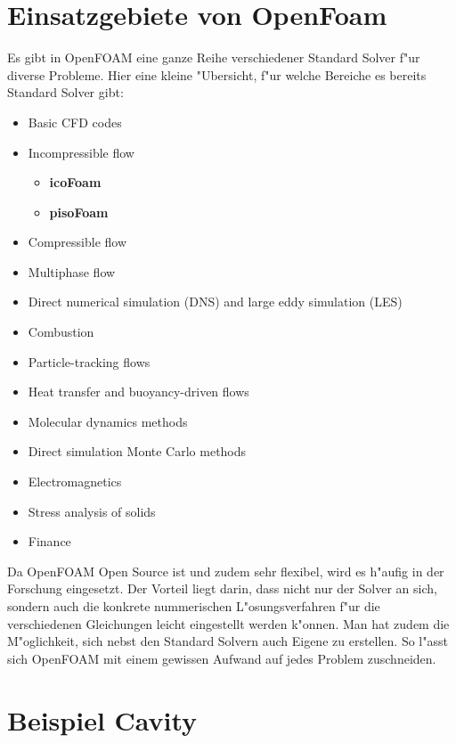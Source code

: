 \begin{refsection}
\section{Einsatzgebiete von OpenFoam}
Es gibt in OpenFOAM eine ganze Reihe verschiedener Standard Solver f"ur diverse Probleme. Hier eine kleine "Ubersicht, f"ur welche Bereiche es bereits Standard Solver gibt:
\begin{itemize}
\setlength{\itemsep}{2pt}
\setlength{\parsep}{2pt}
\item Basic CFD codes  
\item Incompressible flow 
\begin{itemize}
\item \textbf{icoFoam}
\item \textbf{pisoFoam}
\end{itemize}
\item Compressible flow 
\item Multiphase flow
\item Direct numerical simulation (DNS) and large eddy simulation (LES)
\item Combustion
\item Particle-tracking flows
\item Heat transfer and buoyancy-driven flows
\item Molecular dynamics methods
\item Direct simulation Monte Carlo methods
\item Electromagnetics
\item Stress analysis of solids
\item Finance
\end{itemize} 

Da OpenFOAM Open Source ist und zudem sehr flexibel, wird es h"aufig in
der Forschung eingesetzt. Der Vorteil liegt darin, dass nicht nur der
Solver an sich, sondern auch die konkrete nummerischen L"osungsverfahren
f"ur die verschiedenen Gleichungen leicht eingestellt werden k"onnen. Man
hat zudem die M"oglichkeit, sich nebst den Standard Solvern auch Eigene
zu erstellen. So l"asst sich OpenFOAM mit einem gewissen Aufwand auf
jedes Problem zuschneiden. \cite{of}

\section{Beispiel Cavity}

\end{refsection}
